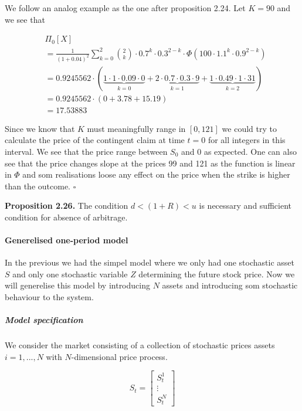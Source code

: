\documentclass[
]{article}
\begin{document}
We follow an analog example as the one after proposition 2.24. Let
\(K=90\) and we see that

\begin{align*}
&\Pi_0[X]\\
&=\frac{1}{(1+0.04)^2}\sum_{k=0}^2\binom{2}{k}\cdot0.7^k\cdot0.3^{2-k}\cdot\Phi(100\cdot 1.1^k\cdot0.9^{2-k})\\
&=0.9245562\cdot\left(\underbrace{1\cdot 1\cdot0.09\cdot0}_{k=0}+\underbrace{2\cdot 0.7\cdot0.
3\cdot 9}_{k=1}+\underbrace{1\cdot 0.49\cdot1\cdot31}_{k=2}\right)\\
&=0.9245562\cdot\left(0+3.78+15.19\right)\\
&=17.53883
\end{align*}

Since we know that \(K\) must meaningfully range in \([0,121]\) we could
try to calculate the price of the contingent claim at time \(t=0\) for
all integers in this interval. We see that the price range between
\(S_0\) and 0 as expected. One can also see that the price changes slope
at the prices 99 and 121 as the function is linear in \(\Phi\) and som
realisations loose any effect on the price when the strike is higher
than the outcome. \(\square\)

\textbf{Proposition 2.26.} The condition \(d<(1+R)<u\) is necessary and
sufficient condition for absence of arbitrage.

\hypertarget{generelised-one-period-model}{%
\paragraph{Generelised one-period
model}\label{generelised-one-period-model}}

In the previous we had the simpel model where we only had one stochastic
asset \(S\) and only one stochastic variable \(Z\) determining the
future stock price. Now we will generelise this model by introducing
\(N\) assets and introducing som stochastic behaviour to the system.

\hypertarget{model-specification}{%
\subparagraph{Model specification}\label{model-specification}}

We consider the market consisting of a collection of stochastic prices
assets \(i=1,...,N\) with \(N\)-dimensional price process.

\[
S_t=\begin{bmatrix} S_t^1\\
\vdots\\
S_t^N\end{bmatrix}
\]
\end{document}
